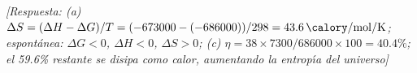 \begin{bloque_ejercicios}
\begin{ejercicios}
\textit{[Respuesta:
(a) $\Delta S = (\Delta H-\Delta G)/T
= (-673000-(-686000))/298
= \SI{+43.6}{\calory\per\mole\per\kelvin}$;
espont\'anea: $\Delta G < 0$, $\Delta H < 0$, $\Delta S > 0$;
(c) $\eta = 38\times7300/686000\times100
= 40.4\%$;
el 59.6\% restante se disipa como calor,
aumentando la entrop\'{\i}a del universo]}

\end{ejercicios}

\end{bloque_ejercicios}
